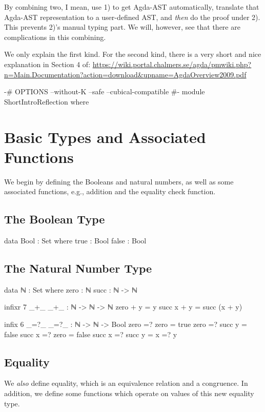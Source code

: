 \documentclass{article}
\begin{document}
By combining two, I mean, use 1) to get Agda-AST automatically, translate that Agda-AST representation to a user-defined AST, and \emph{then} do the proof under 2). This prevents 2)'s manual typing part. We will, however, see that there are complications in this combining.

We only explain the first kind. For the second kind, there is a very short and nice explanation in Section 4 of: \url{https://wiki.portal.chalmers.se/agda/pmwiki.php?n=Main.Documentation?action=download&upname=AgdaOverview2009.pdf}

\begin{code}
{-# OPTIONS --without-K --safe --cubical-compatible #-}
module ShortIntroReflection where 
\end{code}

\section{Basic Types and Associated Functions}
We begin by defining the Booleans and natural numbers, as well as some associated functions, e.g., addition and the equality check function.

\subsection{The Boolean Type}

\begin{code}
data Bool : Set where
  true : Bool
  false : Bool
\end{code}

\subsection{The Natural Number Type}

\begin{code}
data ℕ : Set where
  zero : ℕ
  succ : ℕ -> ℕ

infixr 7 _+_
_+_ : ℕ -> ℕ -> ℕ
zero + y = y
succ x + y = succ (x + y)

infix 6 _=?_
_=?_ : ℕ -> ℕ -> Bool
zero =? zero = true
zero =? succ y = false
succ x =? zero = false
succ x =? succ y = x =? y
\end{code}

\subsection{Equality}

We \emph{also} define equality, which is an equivalence relation and a congruence.  In addition, we define some functions which operate on values of this new equality type.
\end{document}
